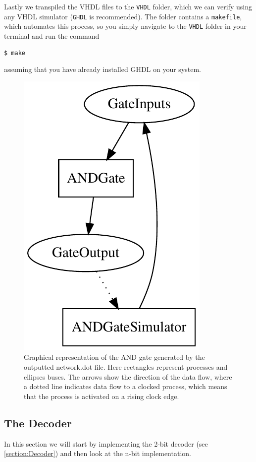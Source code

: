         Lastly we transpiled the VHDL files to the \texttt{VHDL} folder, which we can verify using any VHDL simulator (\texttt{GHDL} is recommended). The folder contains a \texttt{makefile}, which automates this process, so you simply navigate to the \texttt{VHDL} folder in your terminal and run the command
        \begin{lstlisting}[language=bash]
$ make
        \end{lstlisting}
        assuming that you have already installed GHDL on your system.
        
        \begin{figure}[h!]
                \centering
                \includegraphics{pictures/ANDGate.pdf}
                \caption{Graphical representation of the AND gate generated by the outputted network.dot file. Here rectangles represent processes and ellipses buses. The arrows show the direction of the data flow, where a dotted line indicates data flow to a clocked process, which means that the process is activated on a rising clock edge.}
                \label{fig:ANDGateDOTFile}
            
        \end{figure} 
    
    \subsection{The Decoder}
        In this section we will start by implementing the 2-bit decoder (see \ref{section:Decoder}) and then look at the n-bit implementation. 
        
